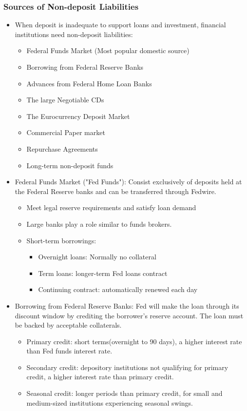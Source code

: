 \subsubsection{Sources of Non-deposit Liabilities}
\begin{itemize}
\item When deposit is inadequate to support loans and investment, financial institutions need non-deposit liabilities:
    \begin{itemize}
    \item Federal Funds Market (Most popular domestic source)
    \item Borrowing from Federal Reserve Banks
    \item Advances from Federal Home Loan Banks
    \item The large Negotiable CDs
    \item The Eurocurrency Deposit Market
    \item Commercial Paper market
    \item Repurchase Agreements
    \item Long-term non-deposit funds
    \end{itemize}
    
\item Federal Funds Market ("Fed Funds"): Consist exclusively of deposits held at the Federal Reserve banks and can be transferred through Fedwire.
    \begin{itemize}
    \item Meet legal reserve requirements and satisfy loan demand
    \item Large banks play a role similar to funds brokers.
    \item Short-term borrowings:
        \begin{itemize}
        \item Overnight loans: Normally no collateral
        \item Term loans: longer-term Fed loans contract
        \item Continuing contract: automatically renewed each day
        \end{itemize}
    \end{itemize}
    
\item Borrowing from Federal Reserve Banks: Fed will make the loan through its discount window by crediting the borrower's reserve account. The loan must be backed by acceptable collaterals.
    \begin{itemize}
    \item Primary credit: short terms(overnight to 90 days), a higher interest rate than Fed funds interest rate.
    \item Secondary credit: depository institutions not qualifying for primary credit, a higher interest rate than primary credit.
    \item Seasonal credit: longer periods than primary credit, for small and medium-sized institutions experiencing seasonal swings.
    \end{itemize}
    

\end{itemize}
